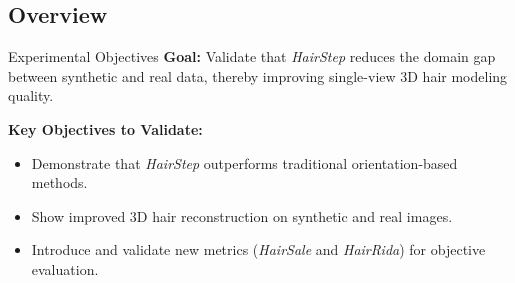 
\subsection{Overview}

\begin{frame}[t]{Experimental Objectives}
    \textbf{Goal:} Validate that \emph{HairStep} reduces the domain gap between synthetic and real data, thereby improving single-view 3D hair modeling quality.

    \vspace{5pt}
    \textbf{Key Objectives to Validate:}
    \begin{itemize}
        \item Demonstrate that \emph{HairStep} outperforms traditional orientation-based methods.
        \item Show improved 3D hair reconstruction on synthetic and real images.
        \item Introduce and validate new metrics (\emph{HairSale} and \emph{HairRida}) for objective evaluation.
    \end{itemize}
\end{frame}

